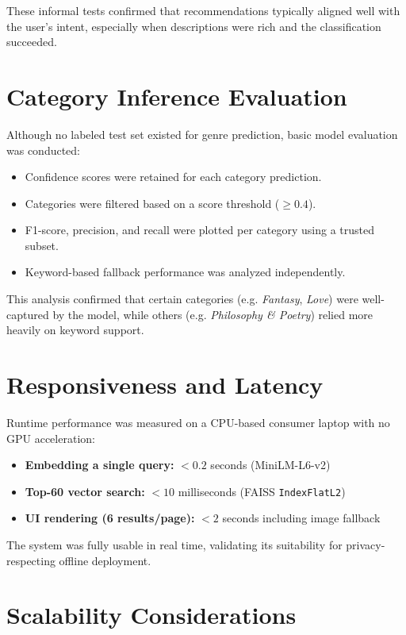 These informal tests confirmed that recommendations typically aligned well with the user’s intent, especially when descriptions were rich and the classification succeeded.

\section{Category Inference Evaluation}
\label{sec:category-eval}

Although no labeled test set existed for genre prediction, basic model evaluation was conducted:

\begin{itemize}
    \item Confidence scores were retained for each category prediction.
    \item Categories were filtered based on a score threshold ($\geq 0.4$).
    \item F1-score, precision, and recall were plotted per category using a trusted subset.
    \item Keyword-based fallback performance was analyzed independently.
\end{itemize}

This analysis confirmed that certain categories (e.g. \textit{Fantasy}, \textit{Love}) were well-captured by the model, while others (e.g. \textit{Philosophy \& Poetry}) relied more heavily on keyword support.

\section{Responsiveness and Latency}
\label{sec:latency}

Runtime performance was measured on a CPU-based consumer laptop with no GPU acceleration:

\begin{itemize}
    \item \textbf{Embedding a single query:} $< 0.2$ seconds (MiniLM-L6-v2)
    \item \textbf{Top-60 vector search:} $< 10$ milliseconds (FAISS \texttt{IndexFlatL2})
    \item \textbf{UI rendering (6 results/page):} $< 2$ seconds including image fallback
\end{itemize}

The system was fully usable in real time, validating its suitability for privacy-respecting offline deployment.

\section{Scalability Considerations}
\label{sec:scaling}

